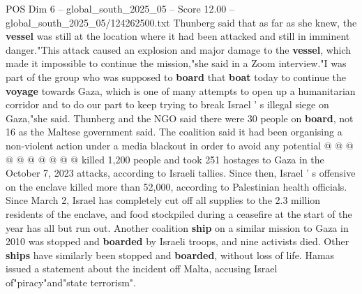 \begin{textsample}{POS Dim 6 – global\_south\_2025\_05 – Score 12.00 – global\_south\_2025\_05/124262500.txt}
Thunberg said that as far as she knew, the \textbf{vessel} was still at the location where it had been attacked and still in imminent danger."This attack caused an explosion and major damage to the \textbf{vessel}, which made it impossible to continue the mission,"she said in a Zoom interview."I was part of the group who was supposed to \textbf{board} that \textbf{boat} today to continue the \textbf{voyage} towards Gaza, which is one of many attempts to open up a humanitarian corridor and to do our part to keep trying to break Israel ' s illegal siege on Gaza,"she said.
Thunberg and the NGO said there were 30 people on \textbf{board}, not 16 as the Maltese government said.
The coalition said it had been organising a non-violent action under a media blackout in order to avoid any potential @ @ @ @ @ @ @ @ @ @ killed 1,200 people and took 251 hostages to Gaza in the October 7, 2023 attacks, according to Israeli tallies.
Since then, Israel ' s offensive on the enclave killed more than 52,000, according to Palestinian health officials.
Since March 2, Israel has completely cut off all supplies to the 2.3 million residents of the enclave, and food stockpiled during a ceasefire at the start of the year has all but run out.
Another coalition \textbf{ship} on a similar mission to Gaza in 2010 was stopped and \textbf{boarded} by Israeli troops, and nine activists died.
Other \textbf{ships} have similarly been stopped and \textbf{boarded}, without loss of life.
Hamas issued a statement about the incident off Malta, accusing Israel of"piracy"and"state terrorism".

\end{textsample}
